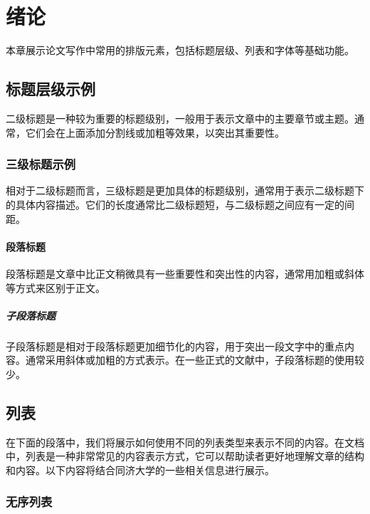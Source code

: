 \chapter{绪论}\label{sec:introduction}

本章展示论文写作中常用的排版元素，包括标题层级、列表和字体等基础功能。

\section{标题层级示例}

二级标题是一种较为重要的标题级别，一般用于表示文章中的主要章节或主题。通常，它们会在上面添加分割线或加粗等效果，以突出其重要性。

\subsection{三级标题示例}

相对于二级标题而言，三级标题是更加具体的标题级别，通常用于表示二级标题下的具体内容描述。它们的长度通常比二级标题短，与二级标题之间应有一定的间距。

\subsubsection{段落标题}

段落标题是文章中比正文稍微具有一些重要性和突出性的内容，通常用加粗或斜体等方式来区别于正文。

\paragraph{子段落标题}

子段落标题是相对于段落标题更加细节化的内容，用于突出一段文字中的重点内容。通常采用斜体或加粗的方式表示。在一些正式的文献中，子段落标题的使用较少。

\section{列表}

在下面的段落中，我们将展示如何使用不同的列表类型来表示不同的内容。在文档中，列表是一种非常常见的内容表示方式，它可以帮助读者更好地理解文章的结构和内容。以下内容将结合同济大学的一些相关信息进行展示。

\subsection{无序列表}

